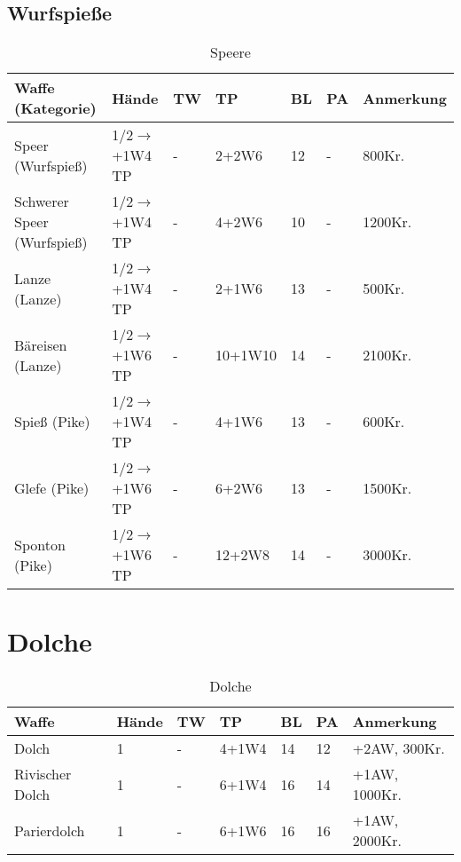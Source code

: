 \subsection{Wurfspieße}
\begin{table}[H]
\begin{center}
\begin{tabular}{|l|l|l|l|l|l|p{2.5cm}|}
\hline
\textbf{Waffe (Kategorie)} & \textbf{Hände} & \textbf{TW} & \textbf{TP} & \textbf{BL} & \textbf{PA} & \textbf{Anmerkung} \\ \hline

Speer (Wurfspieß) & 1/2$\rightarrow$+1W4 TP & - & 2+2W6 & 12 & - & 800Kr. \\ \hline

Schwerer Speer (Wurfspieß) & 1/2$\rightarrow$+1W4 TP & - & 4+2W6 & 10 & - & 1200Kr. \\ \hline

Lanze (Lanze) & 1/2$\rightarrow$+1W4 TP & - & 2+1W6 & 13 & - & 500Kr. \\ \hline

Bäreisen (Lanze) & 1/2$\rightarrow$+1W6 TP & - & 10+1W10 & 14 & - & 2100Kr. \\ \hline

Spieß (Pike) & 1/2$\rightarrow$+1W4 TP & - & 4+1W6 & 13 & - & 600Kr. \\ \hline

Glefe (Pike) & 1/2$\rightarrow$+1W6 TP & - & 6+2W6 & 13 & - & 1500Kr. \\ \hline

Sponton (Pike) & 1/2$\rightarrow$+1W6 TP & - & 12+2W8 & 14 & - & 3000Kr. \\ \hline


\end{tabular}
\end{center}
\caption{Speere}
\label{tab:Speere}
\end{table}

\section{Dolche}
\begin{table}[H]
\begin{center}
\begin{tabular}{|l|l|l|l|l|l|p{2.5cm}|}
\hline
\textbf{Waffe} & \textbf{Hände} & \textbf{TW} & \textbf{TP} & \textbf{BL} & \textbf{PA} & \textbf{Anmerkung} \\

\hline
Dolch & 1 & - & 4+1W4 & 14 & 12 & +2AW, 300Kr. \\

\hline
Rivischer Dolch & 1 & - & 6+1W4 & 16 & 14 & +1AW, 1000Kr. \\ \hline

\hline
Parierdolch & 1 & - & 6+1W6 & 16 & 16 & +1AW, 2000Kr. \\

\hline
\end{tabular}
\end{center}
\caption{Dolche}
\label{tab:Dolche}
\end{table}


